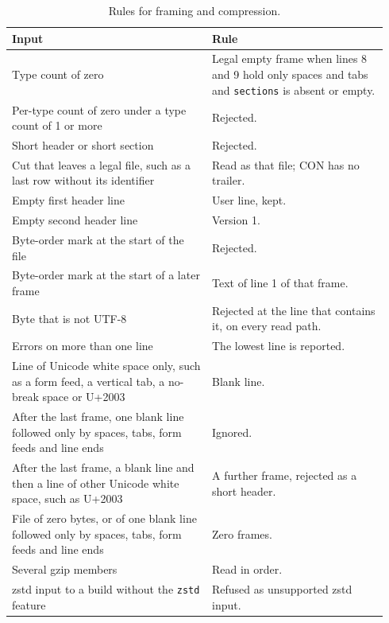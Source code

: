 \documentclass[preprint,12pt]{elsarticle}
\begin{document}
\begin{table}[tbp] \centering \small \caption{Rules for framing and compression.}
\label{tab:rules-framing}
\begin{tabular}{@{}p{0.50\linewidth}p{0.44\linewidth}@{}}
\toprule
Input & Rule \\
\midrule
Type count of zero & Legal empty frame when lines 8 and 9 hold only spaces and tabs and \texttt{sections} is absent or empty. \\
Per-type count of zero under a type count of 1 or more & Rejected. \\
Short header or short section & Rejected. \\
Cut that leaves a legal file, such as a last row without its identifier & Read as that file; CON has no trailer. \\
Empty first header line & User line, kept. \\
Empty second header line & Version 1. \\
Byte-order mark at the start of the file & Rejected. \\
Byte-order mark at the start of a later frame & Text of line 1 of that frame. \\
Byte that is not UTF-8 & Rejected at the line that contains it, on every read path. \\
Errors on more than one line & The lowest line is reported. \\
Line of Unicode white space only, such as a form feed, a vertical tab, a no-break space or U+2003 & Blank line. \\
After the last frame, one blank line followed only by spaces, tabs, form feeds and line ends & Ignored. \\
After the last frame, a blank line and then a line of other Unicode white space, such as U+2003 & A further frame, rejected as a short header. \\
File of zero bytes, or of one blank line followed only by spaces, tabs, form feeds and line ends & Zero frames. \\
Several gzip members & Read in order. \\
zstd input to a build without the \texttt{zstd} feature & Refused as unsupported zstd input. \\
\bottomrule
\end{tabular}
\end{table}
\end{document}
